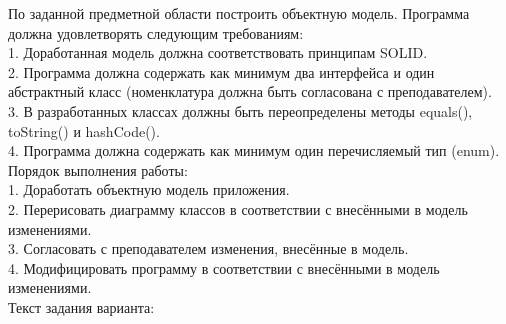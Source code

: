 \documentclass[12pt]{article}
\begin{document}
По заданной предметной области построить объектную модель. Программа должна удовлетворять следующим требованиям:\\
1. Доработанная модель должна соответствовать принципам SOLID.\\
2. Программа должна содержать как минимум два интерфейса и один абстрактный класс (номенклатура должна быть согласована с преподавателем).\\
3. В разработанных классах должны быть переопределены методы equals(), toString() и hashCode().\\
4. Программа должна содержать как минимум один перечисляемый тип (enum).\\
Порядок выполнения работы:\\
1. Доработать объектную модель приложения.\\
2. Перерисовать диаграмму классов в соответствии с внесёнными в модель изменениями.\\
3. Согласовать с преподавателем изменения, внесённые в модель.\\
4. Модифицировать программу в соответствии с внесёнными в модель изменениями.\\
Текст задания варианта:\\
\end{document}
